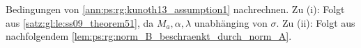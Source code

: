 \begin{Beweis}
Bedingungen von \cref{ann:ps:rg:kunoth13_assumption1} nachrechnen.
Zu (i): Folgt aus \cref{satz:gl:le:ss09_theorem51}, da $M_{a}, \alpha, \lambda$ unabhänging von $\sigma$.
Zu (ii): Folgt aus nachfolgendem \cref{lem:ps:rg:norm_B_beschraenkt_durch_norm_A}.
\end{Beweis}
